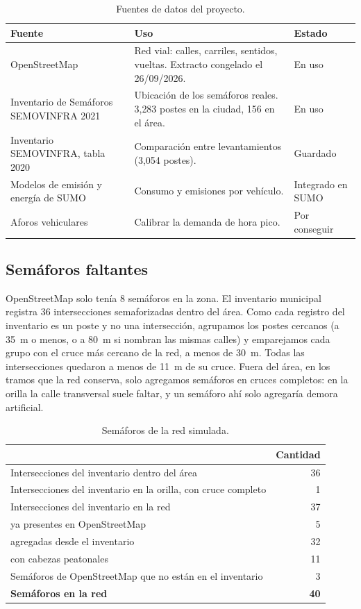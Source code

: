 \documentclass[11pt,letterpaper]{article}
\begin{document}
\begin{table}[H]
\centering\small
\caption{Fuentes de datos del proyecto.}
\label{tab:datos}
\begin{tabularx}{\linewidth}{@{}l L l@{}}
\toprule
Fuente & Uso & Estado\\
\midrule
OpenStreetMap~\cite{osm} & Red vial: calles, carriles, sentidos, vueltas. Extracto congelado el 26/09/2026. & En uso\\
Inventario de Semáforos SEMOVINFRA 2021~\cite{inventario} & Ubicación de los semáforos reales. 3{,}283 postes en la ciudad, 156 en el área. & En uso\\
Inventario SEMOVINFRA, tabla 2020~\cite{inventario} & Comparación entre levantamientos (3{,}054 postes). & Guardado\\
Modelos de emisión y energía de SUMO~\cite{sumoemisiones,kurczveil} & Consumo y emisiones por vehículo. & Integrado en SUMO\\
Aforos vehiculares & Calibrar la demanda de hora pico. & Por conseguir\\
\bottomrule
\end{tabularx}
\end{table}

\subsection{Semáforos faltantes}

OpenStreetMap solo tenía 8 semáforos en la zona. El inventario municipal registra
36 intersecciones semaforizadas dentro del área. Como cada registro del
inventario es un poste y no una intersección, agrupamos los postes cercanos (a
35~m o menos, o a 80~m si nombran las mismas calles) y emparejamos cada grupo con el
cruce más cercano de la red, a menos de 30~m. Todas las intersecciones quedaron a
menos de 11~m de su cruce. Fuera del área, en los tramos que la red conserva, solo
agregamos semáforos en cruces completos: en la orilla la calle transversal suele
faltar, y un semáforo ahí solo agregaría demora artificial.

\begin{table}[!htbp]
\centering\small
\caption{Semáforos de la red simulada.}
\begin{tabular}{lr}
\toprule
& Cantidad\\
\midrule
Intersecciones del inventario dentro del área & 36\\
Intersecciones del inventario en la orilla, con cruce completo & 1\\
\midrule
Intersecciones del inventario en la red & 37\\
\quad ya presentes en OpenStreetMap & 5\\
\quad agregadas desde el inventario & 32\\
\quad con cabezas peatonales & 11\\
Semáforos de OpenStreetMap que no están en el inventario & 3\\
\midrule
\textbf{Semáforos en la red} & \textbf{40}\\
\bottomrule
\end{tabular}
\end{table}
\end{document}
